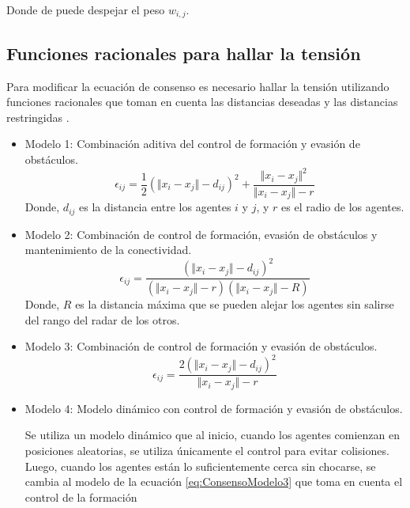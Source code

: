 Donde de puede despejar el peso $w_{i,j}$.

\subsection{Funciones racionales para hallar la tensión}
Para modificar la ecuación de consenso es necesario hallar la tensión utilizando funciones racionales que toman en cuenta las distancias deseadas y las distancias restringidas \cite{PenaAM_2019_tesis}.

\begin{itemize}
	\item Modelo 1: Combinación aditiva del control de formación y evasión de obstáculos.
	\begin{equation}
		\epsilon_{ij} = \frac{1}{2}(\Vert x_i - x_j \Vert - d_{ij})^2 + \frac{\Vert x_i - x_j \Vert^2}{\Vert x_i - x_j \Vert - r}
		\label{eq:ConsensoModelo1}
	\end{equation}
	Donde, $d_{ij}$ es la distancia entre los agentes $i$ y $j$, y $r$ es el radio de los agentes.
	
	\item Modelo 2: Combinación de control de formación, evasión de obstáculos y mantenimiento de la conectividad.
	\begin{equation}
		\epsilon_{ij} = \frac{(\Vert x_i - x_j \Vert - d_{ij})^2}{(\Vert x_i - x_j \Vert - r)(\Vert x_i - x_j \Vert - R)}
		\label{eq:ConsensoModelo2}
	\end{equation}
	Donde, $R$ es la distancia máxima que se pueden alejar los agentes sin salirse del rango del radar de los otros.
	
	\item Modelo 3: Combinación de control de formación y evasión de obstáculos.
	\begin{equation}
		\epsilon_{ij} = \frac{2(\Vert x_i - x_j \Vert - d_{ij})^2}{\Vert x_i - x_j \Vert - r}
		\label{eq:ConsensoModelo3}
	\end{equation}
	
	\item Modelo 4: Modelo dinámico con control de formación y evasión de obstáculos.\par
	
	Se utiliza un modelo dinámico que al inicio, cuando los agentes comienzan en posiciones aleatorias, se utiliza únicamente el control para evitar colisiones. Luego, cuando los agentes están lo suficientemente cerca sin chocarse, se cambia al modelo de la ecuación \ref{eq:ConsensoModelo3} que toma en cuenta el control de la formación 
	

\end{itemize}
